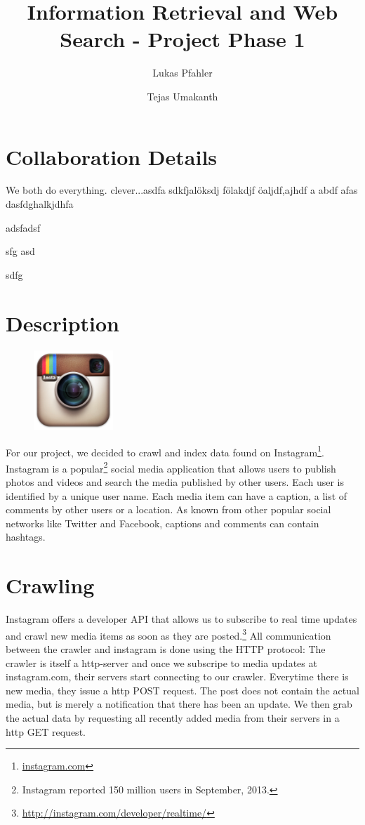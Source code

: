 \documentclass[11pt]{article}
\title{Information Retrieval and Web Search - Project Phase 1}
\author{Lukas Pfahler \and Tejas Umakanth}
\begin{document}
\maketitle
\section{Collaboration Details}
	We both do everything. clever...asdfa sdkfjalöksdj fölakdjf öaljdf,ajhdf a abdf afas
	dasfdghalkjdhfa


	adsfadsf

	sfg
	asd

	sdfg
\section{Description}
	\begin{figure}
  		\vspace{-0.6cm}
  		\includegraphics[width=3cm,height=3cm]{logo.png}
	\end{figure}
	For our project, we decided to crawl and index data found on Instagram\footnote{\url{instagram.com}}. Instagram is a popular\footnote{Instagram reported 150 million users in September, 2013.} social media application that allows users to publish photos and videos and search the media published by other users. Each user is identified by a unique user name. Each media item can have a caption, a list of comments by other users or a location. As known from other popular social networks like Twitter and Facebook, captions and comments can contain hashtags.
\section{Crawling}
	Instagram offers a developer API that allows us to subscribe to real time updates and crawl new media items as soon as they are posted.\footnote{\url{http://instagram.com/developer/realtime/}} All communication between the crawler and instagram is done using the HTTP protocol: The crawler is itself a http-server and once we subscripe to media updates at instagram.com, their servers start connecting to our crawler. Everytime there is new media, they issue a http POST request. The post does not contain the actual media, but is merely a notification that there has been an update. We then grab the actual data by requesting all recently added media from their servers in a http GET request.
\end{document}
